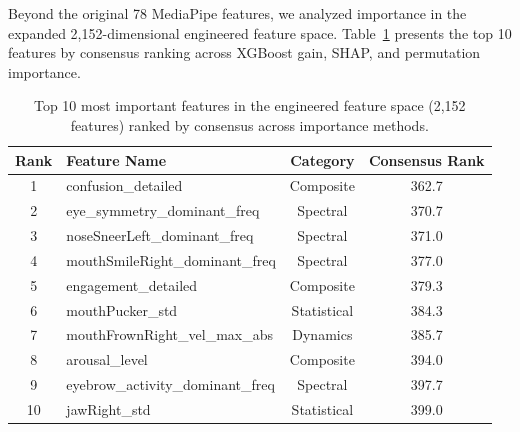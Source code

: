 Beyond the original 78 MediaPipe features, we analyzed importance in the expanded 2,152-dimensional engineered feature space. Table~\ref{tab:top-engineered-features} presents the top 10 features by consensus ranking across XGBoost gain, SHAP, and permutation importance.

\begin{table}[t]
\centering
\caption{Top 10 most important features in the engineered feature space (2,152 features) ranked by consensus across importance methods.}
\label{tab:top-engineered-features}
\begin{tabular}{clcc}
\toprule
\textbf{Rank} & \textbf{Feature Name} & \textbf{Category} & \textbf{Consensus Rank} \\
\midrule
1 & confusion\_detailed & Composite & 362.7 \\
2 & eye\_symmetry\_dominant\_freq & Spectral & 370.7 \\
3 & noseSneerLeft\_dominant\_freq & Spectral & 371.0 \\
4 & mouthSmileRight\_dominant\_freq & Spectral & 377.0 \\
5 & engagement\_detailed & Composite & 379.3 \\
6 & mouthPucker\_std & Statistical & 384.3 \\
7 & mouthFrownRight\_vel\_max\_abs & Dynamics & 385.7 \\
8 & arousal\_level & Composite & 394.0 \\
9 & eyebrow\_activity\_dominant\_freq & Spectral & 397.7 \\
10 & jawRight\_std & Statistical & 399.0 \\
\bottomrule
\end{tabular}
\end{table}

